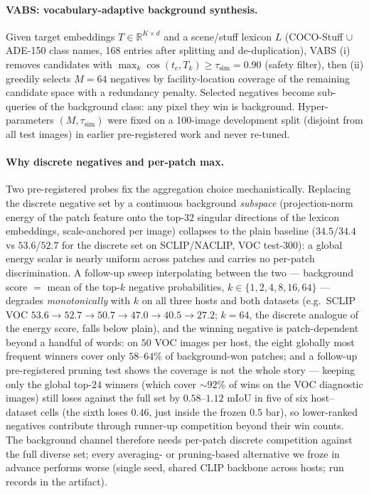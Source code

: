 \documentclass[11pt]{article}
\newcommand{\miou}{mIoU}
\begin{document}
\paragraph{VABS: vocabulary-adaptive background synthesis.} Given target embeddings
$T\in\mathbb{R}^{K\times d}$ and a scene/stuff lexicon $L$ (COCO-Stuff
\citep{caesar2018cocostuff} $\cup$ ADE-150 \citep{zhou2017ade} class names, 168 entries after splitting and de-duplication), VABS (i) removes
candidates with $\max_k \cos(t_c, T_k) \ge \tau_{\mathrm{sim}}=0.90$ (safety filter),
then (ii) greedily selects $M=64$ negatives by facility-location coverage
\citep{krause2014submodular} of the remaining candidate space with a redundancy penalty. Selected negatives become
sub-queries of the background class: any pixel they win is background. Hyper-parameters
$(M,\tau_{\mathrm{sim}})$ were fixed on a 100-image development split (disjoint from
all test images) in earlier pre-registered work and never re-tuned.

\paragraph{Why discrete negatives and per-patch max.} Two pre-registered
probes fix the aggregation choice mechanistically. Replacing the discrete
negative set by a continuous background \emph{subspace} (projection-norm
energy of the patch feature onto the top-$32$ singular directions of the
lexicon embeddings, scale-anchored per image) collapses to the plain
baseline ($34.5$/$34.4$ vs $53.6$/$52.7$ for the discrete set on
SCLIP/NACLIP, VOC test-300): a global energy scalar is nearly uniform
across patches and carries no per-patch discrimination. A follow-up sweep
interpolating between the two --- background score $=$ mean of the top-$k$
negative probabilities, $k\in\{1,2,4,8,16,64\}$ --- degrades
\emph{monotonically} with $k$ on all three hosts and both datasets (e.g.\
SCLIP VOC $53.6 \to 52.7 \to 50.7 \to 47.0 \to 40.5 \to 27.2$; $k{=}64$,
the discrete analogue of the energy score, falls below plain), and the
winning negative is patch-dependent beyond a handful of words: on $50$
VOC images per host, the eight globally most frequent winners cover only
$58$--$64\%$ of background-won patches; and a follow-up pre-registered
pruning test shows the coverage is not the whole story --- keeping only
the global top-$24$ winners (which cover ${\sim}92\%$ of wins on the
VOC diagnostic images) still loses against the
full set by $0.58$--$1.12$ \miou{} in five of six host--dataset cells
(the sixth loses $0.46$, just inside the frozen $0.5$ bar), so
lower-ranked negatives contribute
through runner-up competition beyond their win counts. The background channel therefore needs per-patch
discrete competition against the full diverse set; every averaging- or
pruning-based alternative we froze in advance performs worse (single
seed, shared CLIP backbone across hosts; run records in the artifact).
\end{document}
